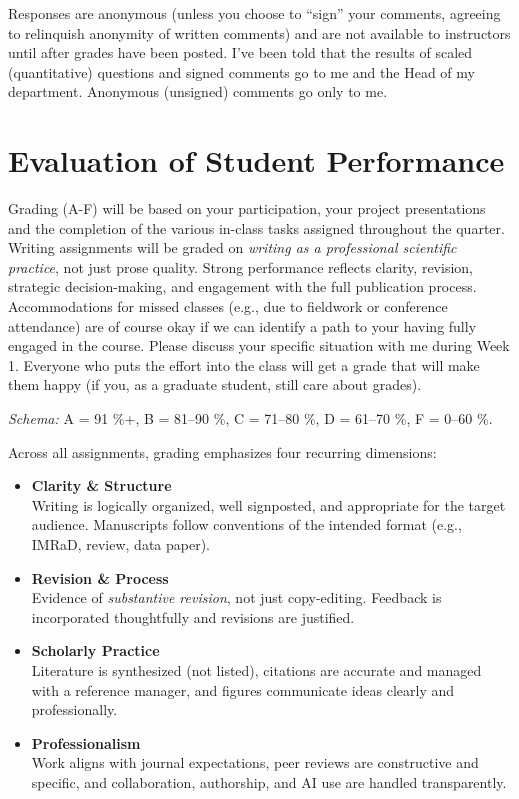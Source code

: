 \documentclass[10pt]{article}
\begin{document}
\noindent
Responses are anonymous (unless you choose to ``sign'' your comments, 
agreeing to relinquish anonymity of written comments) and are not available to 
instructors until after grades have been posted. 
I've been told that the results of scaled (quantitative) questions and signed 
comments go to me and the Head 
of my department.
Anonymous (unsigned) comments go only to me.

	
\section*{Evaluation of Student Performance}
\noindent
Grading (A-F) will be based on your participation, 
your project presentations 
and the completion of the various in-class tasks assigned throughout the quarter. 
Writing assignments will be graded on \textit{writing as a professional scientific practice}, not just 
prose quality.
Strong performance reflects clarity, revision, strategic decision-making, and engagement with the 
full publication process.
Accommodations for missed classes (e.g., due to fieldwork or conference attendance) are of course 
okay if we can identify a path to your having fully engaged in the course.
Please discuss your specific situation with me during Week 1.
Everyone who puts the effort into the class will get a grade that will make them happy (if you, as a 
graduate student, still care about grades).


\textit{Schema:} 
A = 91 \%+, 
B = 81--90 \%, 
C = 71--80 \%, 
D = 61--70 \%, 
F = 0--60 \%.
	
	Across all assignments, grading emphasizes four recurring dimensions:
	
	\begin{itemize}[leftmargin=*]
		\item \textbf{Clarity \& Structure}\\
		Writing is logically organized, well signposted, and appropriate for the target audience.
		Manuscripts follow conventions of the intended format (e.g., IMRaD, review, data paper).
		
		\item \textbf{Revision \& Process}\\
		Evidence of \emph{substantive revision}, not just copy-editing.
		Feedback is incorporated thoughtfully and revisions are justified.
		
		\item \textbf{Scholarly Practice}\\
		Literature is synthesized (not listed), citations are accurate and managed with a reference 
		manager,
		and figures communicate ideas clearly and professionally.
		
		\item \textbf{Professionalism}\\
		Work aligns with journal expectations, peer reviews are constructive and specific,
		and collaboration, authorship, and AI use are handled transparently.
	\end{itemize}
	
\end{document}
